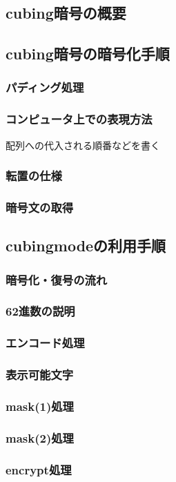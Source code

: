 \subsection{cubing暗号の概要}
\subsection{cubing暗号の暗号化手順}
\subsubsection{パディング処理}
\subsubsection{コンピュータ上での表現方法}
配列への代入される順番などを書く
\subsubsection{転置の仕様}
\subsubsection{暗号文の取得}
\subsection{cubingmodeの利用手順}
\subsubsection{暗号化・復号の流れ}
\subsubsection{62進数の説明}
\subsubsection{エンコード処理}
\subsubsection{表示可能文字}
\subsubsection{mask(1)処理}
\subsubsection{mask(2)処理}
\subsubsection{encrypt処理}

